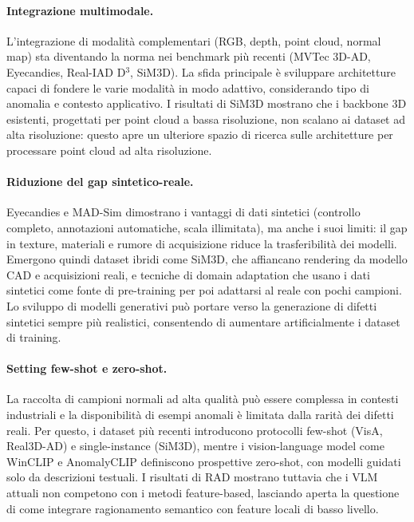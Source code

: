 \paragraph{Integrazione multimodale.}
L'integrazione di modalità complementari (RGB, depth, point cloud, normal map) sta diventando la norma nei benchmark più recenti (MVTec 3D-AD, Eyecandies, Real-IAD D$^3$, SiM3D). La sfida principale è sviluppare architetture capaci di fondere le varie modalità in modo adattivo, considerando tipo di anomalia e contesto applicativo. I risultati di SiM3D mostrano che i backbone 3D esistenti, progettati per point cloud a bassa risoluzione, non scalano ai dataset ad alta risoluzione: questo apre un ulteriore spazio di ricerca sulle architetture per processare point cloud ad alta risoluzione.

\paragraph{Riduzione del gap sintetico-reale.}
Eyecandies e MAD-Sim dimostrano i vantaggi di dati sintetici (controllo completo, annotazioni automatiche, scala illimitata), ma anche i suoi limiti: il gap in texture, materiali e rumore di acquisizione riduce la trasferibilità dei modelli. Emergono quindi dataset ibridi come SiM3D, che affiancano rendering da modello CAD e acquisizioni reali, e tecniche di domain adaptation che usano i dati sintetici come fonte di pre-training per poi adattarsi al reale con pochi campioni. Lo sviluppo di modelli generativi può portare verso la generazione di difetti sintetici sempre più realistici, consentendo di aumentare artificialmente i dataset di training.

\paragraph{Setting few-shot e zero-shot.}
La raccolta di campioni normali ad alta qualità può essere complessa in contesti industriali e la disponibilità di esempi anomali è limitata dalla rarità dei difetti reali. Per questo, i dataset più recenti introducono protocolli few-shot (VisA, Real3D-AD) e single-instance
(SiM3D), mentre i vision-language model come WinCLIP e AnomalyCLIP definiscono prospettive zero-shot, con modelli guidati solo da descrizioni testuali. I risultati di RAD mostrano tuttavia che i VLM attuali non competono con i metodi feature-based, lasciando aperta la questione di come integrare ragionamento semantico con feature locali di basso livello.

